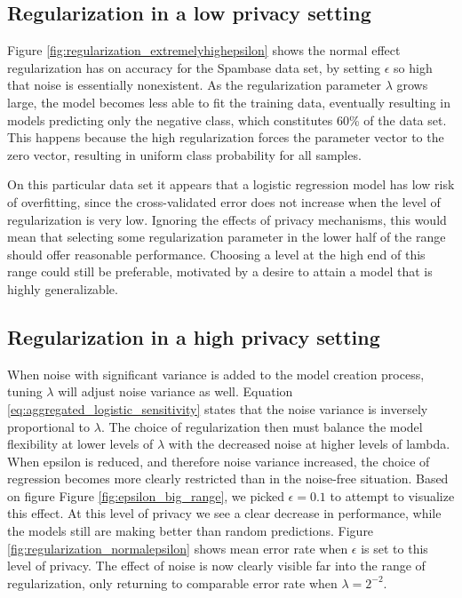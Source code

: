 \subsection{Regularization in a low privacy setting}
Figure \ref{fig:regularization_extremelyhighepsilon} shows the normal effect regularization has on accuracy for the Spambase data set, by setting $\epsilon$ so high that noise is essentially nonexistent. As the regularization parameter $\lambda$ grows large, the model becomes less able to fit the training data, eventually resulting in models predicting only the negative class, which constitutes 60\% of the data set. This happens because the high regularization forces the parameter vector to the zero vector, resulting in uniform class probability for all samples. 

On this particular data set it appears that a logistic regression model has low risk of overfitting, since the cross-validated error does not increase when the level of regularization is very low. Ignoring the effects of privacy mechanisms, this would mean that selecting some regularization parameter in the lower half of the range should offer reasonable performance. Choosing a level at the high end of this range could still be preferable, motivated by a desire to attain a model that is highly generalizable.

\subsection{Regularization in a high privacy setting}

When noise with significant variance is added to the model creation process, tuning $\lambda$ will adjust noise variance as well. Equation \ref{eq:aggregated_logistic_sensitivity} states that the noise variance is inversely proportional to $\lambda$. The choice of regularization then must balance the model flexibility at lower levels of $\lambda$ with the decreased noise at higher levels of lambda. When epsilon is reduced, and therefore noise variance increased, the choice of regression becomes more clearly restricted than in the noise-free situation. Based on figure Figure \ref{fig:epsilon_big_range}, we picked $\epsilon = 0.1$ to attempt to visualize this effect. At this level of privacy we see a clear decrease in performance, while the models still are making better than random predictions. Figure \ref{fig:regularization_normalepsilon} shows mean error rate when $\epsilon$ is set to this level of privacy. The effect of noise is now clearly visible far into the range of regularization, only returning to comparable error rate when $\lambda = 2^{-2}$. 

